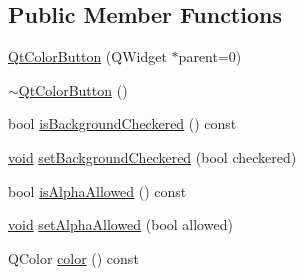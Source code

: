 \subsection*{\-Public \-Member \-Functions}
\begin{DoxyCompactItemize}
\item 
\hyperlink{class_utils_1_1_qt_color_button_a862470cc17ccbdbf69d12e6b3baffd3f}{\-Qt\-Color\-Button} (\-Q\-Widget $\ast$parent=0)
\item 
\hyperlink{class_utils_1_1_qt_color_button_ab59d7fd36eca0eb26a51569377968efc}{$\sim$\-Qt\-Color\-Button} ()
\item 
bool \hyperlink{class_utils_1_1_qt_color_button_a397b4327a6364c35a8b874a793448d8e}{is\-Background\-Checkered} () const 
\item 
\hyperlink{group___u_a_v_objects_plugin_ga444cf2ff3f0ecbe028adce838d373f5c}{void} \hyperlink{class_utils_1_1_qt_color_button_a5fde758d6b75cddc7100d7c8ab9d3b55}{set\-Background\-Checkered} (bool checkered)
\item 
bool \hyperlink{class_utils_1_1_qt_color_button_af75a4d95ae33c4b60984d3bd63192ea4}{is\-Alpha\-Allowed} () const 
\item 
\hyperlink{group___u_a_v_objects_plugin_ga444cf2ff3f0ecbe028adce838d373f5c}{void} \hyperlink{class_utils_1_1_qt_color_button_af7e383413673edc1a12e2f1720b729c6}{set\-Alpha\-Allowed} (bool allowed)
\item 
\-Q\-Color \hyperlink{class_utils_1_1_qt_color_button_a92e2a2c0c46041074dddcbdc67ae682a}{color} () const 
\end{DoxyCompactItemize}
